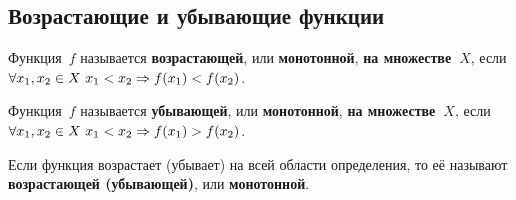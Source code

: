 \subsection{Возрастающие и убывающие функции}
 Функция~$f$ называется \textbf{возрастающей}, или \textbf{монотонной}, \textbf{на множестве~$X$}, если $\forall x_1, x_2 \in X \ x_1 < x_2 \opbr\Rightarrow f(x_1) < f(x_2)$.

 Функция~$f$ называется \textbf{убывающей}, или \textbf{монотонной}, \textbf{на множестве~$X$}, если $\forall x_1, x_2 \in X \ x_1 < x_2 \opbr\Rightarrow f(x_1) > \nobreak f(x_2)$.

Если функция возрастает (убывает) на всей области определения, то её называют \textbf{возрастающей (убывающей)}, или \textbf{монотонной}.

